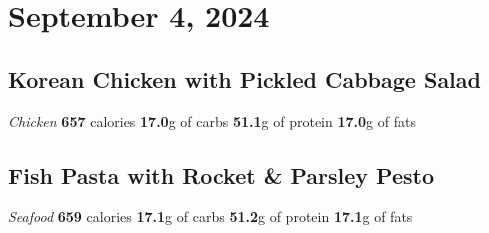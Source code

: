 \documentclass{article}%
\begin{document}
\section*{September 4, 2024}%
\label{sec:September4,2024}%
\begin{paracol}[2]{2}%
\sloppy%
\subsection*{Korean Chicken with Pickled Cabbage Salad}%
\label{subsec:KoreanChickenwithPickledCabbageSalad}%
\textit{Chicken}%
\newline%
\newline%
\textbf{657} calories%
\newline%
\textbf{17.0}g of carbs%
\newline%
\textbf{51.1}g of protein%
\newline%
\textbf{17.0}g of fats%
\newline%
\switchcolumn

%
\subsection*{Fish Pasta with Rocket \& Parsley Pesto}%
\label{subsec:FishPastawithRocketParsleyPesto}%
\textit{Seafood}%
\newline%
\newline%
\textbf{659} calories%
\newline%
\textbf{17.1}g of carbs%
\newline%
\textbf{51.2}g of protein%
\newline%
\textbf{17.1}g of fats%
\newline%
\switchcolumn

%
\end{paracol}

%
\end{document}
